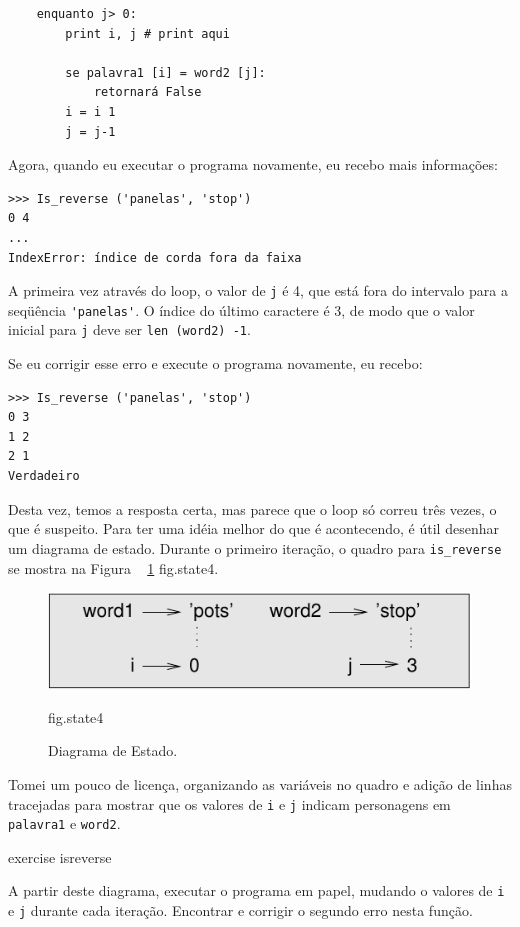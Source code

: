 \documentclass[10pt]{book}
\begin{document}
\begin{exercise}
\begin{verbatim}
    enquanto j> 0:
        print i, j # print aqui
        
        se palavra1 [i] = word2 [j]:
            retornará False
        i = i 1
        j = j-1
\end{verbatim}
%
Agora, quando eu executar o programa novamente, eu recebo mais informações:

\begin{verbatim}
>>> Is_reverse ('panelas', 'stop')
0 4
...
IndexError: índice de corda fora da faixa
\end{verbatim}
%
A primeira vez através do loop, o valor de {\tt j} é 4,
que está fora do intervalo para a seqüência \verb "'panelas'".
O índice do último caractere é 3, de modo que o
valor inicial para {\tt j} deve ser {\tt len ​​(word2) -1}.

Se eu corrigir esse erro e execute o programa novamente, eu recebo:

\begin{verbatim}
>>> Is_reverse ('panelas', 'stop')
0 3
1 2
2 1
Verdadeiro
\end{verbatim}
%
Desta vez, temos a resposta certa, mas parece que o loop só correu
três vezes, o que é suspeito. Para ter uma idéia melhor do que é
acontecendo, é útil desenhar um diagrama de estado. Durante o primeiro
iteração, o quadro para \verb "is_reverse" se mostra na Figura ~ \ref {} fig.state4.

\begin{figure}
\centerline
{\includegraphics[scale = 0.8] {figs/state4.pdf}}
\caption{Diagrama de Estado.}
\label{} fig.state4
\end{figure}


Tomei um pouco de licença, organizando as variáveis ​​no quadro
e adição de linhas tracejadas para mostrar que os valores de {\tt i} e
{\tt j} indicam personagens em {\tt palavra1} e {\tt word2}.

\begin{} exercise
\label{} isreverse

A partir deste diagrama, executar o programa em papel, mudando o
valores de {\tt i} e {\tt j} durante cada iteração. Encontrar e corrigir o
segundo erro nesta função.


\end{}
\end{exercise}
\end{document}
